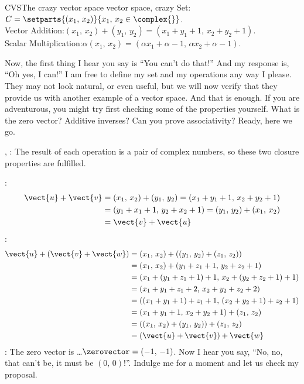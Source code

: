 \begin{example}{CVS}{The crazy vector space }{vector space, crazy}
Set:\quad $C=\setparts{(x_1,\,x_2)}{x_1,\,x_2\in\complex{\null}}$.\\
Vector Addition:\quad  $(x_1,\,x_2)+(y_1,\,y_2)=(x_1+y_1+1,\,x_2+y_2+1)$.\\
Scalar Multiplication:\quad $\alpha(x_1,\,x_2)=(\alpha x_1+\alpha-1,\,\alpha x_2+\alpha-1)$.\par\medskip
%
Now, the first thing I hear you say is ``You can't do that!''  And my response is, ``Oh yes, I can!''  I am free to define my set and my operations any way I please.  They may not look natural, or even useful, but we will now verify that they provide us with another example of a vector space.  And that is enough.  If you are adventurous, you might try first checking some of the properties yourself.  What is the zero vector?  Additive inverses?  Can you prove associativity?  Ready, here we go.\par
%
, :  The result of each operation is a pair of complex numbers, so these two closure properties are fulfilled.\par
%
:
%
\begin{align*}
\vect{u}+\vect{v}&=(x_1,\,x_2)+(y_1,\,y_2)=(x_1+y_1+1,\,x_2+y_2+1)\\
&=(y_1+x_1+1,\,y_2+x_2+1)=(y_1,\,y_2)+(x_1,\,x_2)\\
&=\vect{v}+\vect{u}
\end{align*}
%
:
%
\begin{align*}
\vect{u}+(\vect{v}+\vect{w})&=(x_1,\,x_2)+\left((y_1,\,y_2)+(z_1,\,z_2)\right)\\
&=(x_1,\,x_2)+(y_1+z_1+1,\,y_2+z_2+1)\\
&=(x_1+(y_1+z_1+1)+1,\,x_2+(y_2+z_2+1)+1)\\
&=(x_1+y_1+z_1+2,\,x_2+y_2+z_2+2)\\
&=((x_1+y_1+1)+z_1+1,\,(x_2+y_2+1)+z_2+1)\\
&=(x_1+y_1+1,\,x_2+y_2+1)+(z_1,\,z_2)\\
&=\left((x_1,\,x_2)+(y_1,\,y_2)\right)+(z_1,\,z_2)\\
&=\left(\vect{u}+\vect{v}\right)+\vect{w}
\end{align*}
%
:  The zero vector is \dots $\zerovector=(-1,\,-1)$.  Now I hear you say, ``No, no, that can't be, it must be $(0,\,0)$!''.  Indulge me for a moment and let us check my proposal.
%
\begin{equation*}

\end{equation*}
\end{example}
